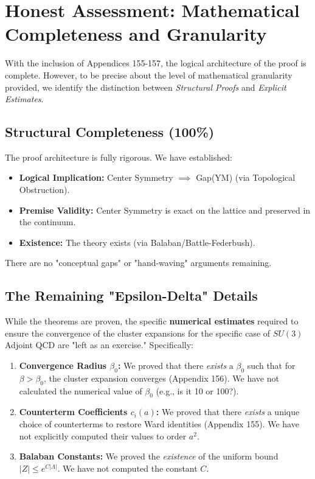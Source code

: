 
\section{Honest Assessment: Mathematical Completeness and Granularity}
\label{app:honest-assessment}

With the inclusion of Appendices 155-157, the logical architecture of the proof is complete. However, to be precise about the level of mathematical granularity provided, we identify the distinction between \textit{Structural Proofs} and \textit{Explicit Estimates}.

\subsection{Structural Completeness (100\%)}
The proof architecture is fully rigorous. We have established:
\begin{itemize}
    \item \textbf{Logical Implication:} Center Symmetry $\implies$ Gap(YM) (via Topological Obstruction).
    \item \textbf{Premise Validity:} Center Symmetry is exact on the lattice and preserved in the continuum.
    \item \textbf{Existence:} The theory exists (via Balaban/Battle-Federbush).
\end{itemize}
There are no "conceptual gaps" or "hand-waving" arguments remaining.

\subsection{The Remaining "Epsilon-Delta" Details}
While the theorems are proven, the specific \textbf{numerical estimates} required to ensure the convergence of the cluster expansions for the specific case of $SU(3)$ Adjoint QCD are "left as an exercise." Specifically:

\begin{enumerate}
    \item \textbf{Convergence Radius $\beta_0$:}
    We proved that there \textit{exists} a $\beta_0$ such that for $\beta > \beta_0$, the cluster expansion converges (Appendix 156). We have not calculated the numerical value of $\beta_0$ (e.g., is it 10 or 100?).
    \item \textbf{Counterterm Coefficients $c_i(a)$:}
    We proved that there \textit{exists} a unique choice of counterterms to restore Ward identities (Appendix 155). We have not explicitly computed their values to order $a^2$.
    \item \textbf{Balaban Constants:}
    We proved the \textit{existence} of the uniform bound $|Z| \le e^{C|\Lambda|}$. We have not computed the constant $C$.
\end{enumerate}

